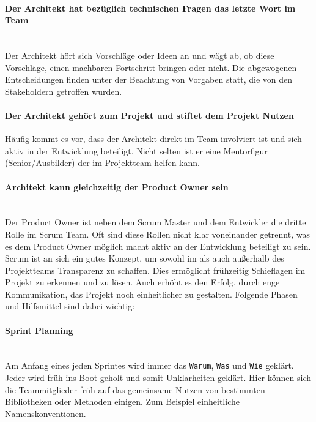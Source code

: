 \documentclass[a4paper, ngerman, 12pt, usenames, dvipsnames]{article}
\begin{document}
    \paragraph{Der Architekt hat bezüglich technischen Fragen das letzte Wort im Team}\mbox{} \\
    Der Architekt hört sich Vorschläge oder Ideen an und wägt ab, ob diese Vorschläge, einen machbaren Fortschritt bringen oder nicht.
    Die abgewogenen Entscheidungen finden unter der Beachtung von Vorgaben statt, die von den Stakeholdern getroffen wurden.
    
    \paragraph{Der Architekt gehört zum Projekt und stiftet dem Projekt Nutzen}\mbox{} 
    Häufig kommt es vor, dass der Architekt direkt im Team involviert ist und sich aktiv in der Entwicklung beteiligt.
    Nicht selten ist er eine Mentorfigur (Senior/Ausbilder) der im Projektteam helfen kann.
    
    \paragraph{Architekt kann gleichzeitig der Product Owner sein}\mbox{} \\
    Der Product Owner ist neben dem Scrum Master und dem Entwickler die dritte Rolle im Scrum Team.
    Oft sind diese Rollen nicht klar voneinander getrennt, was es dem Product Owner möglich macht aktiv an der Entwicklung beteiligt zu sein.\\
    
    Scrum ist an sich ein gutes Konzept, um sowohl im als auch außerhalb des Projektteams Transparenz zu schaffen.
    Dies ermöglicht frühzeitig Schieflagen im Projekt zu erkennen und zu lösen. Auch erhöht es den Erfolg, durch enge Kommunikation, das Projekt noch einheitlicher zu gestalten.
    Folgende Phasen und Hilfsmittel sind dabei wichtig:

    \paragraph{Sprint Planning}\mbox{} \\
    Am Anfang eines jeden Sprintes wird immer das \texttt{Warum}, \texttt{Was} und \texttt{Wie} geklärt. 
    Jeder wird früh ins Boot geholt und somit Unklarheiten geklärt.
    Hier können sich die Teammitglieder früh auf das gemeinsame Nutzen von bestimmten Bibliotheken oder Methoden einigen. Zum Beispiel einheitliche Namenskonventionen.
\end{document}
